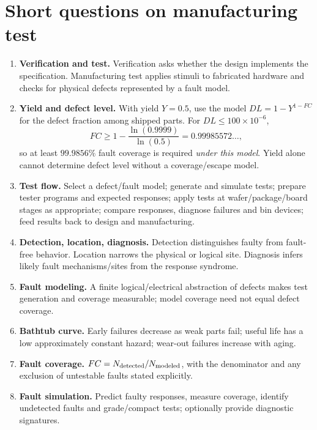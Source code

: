 \documentclass[11pt]{article}
\begin{document}
\section{Short questions on manufacturing test}
\begin{enumerate}[label=(\alph*)]
\item \textbf{Verification and test.} Verification asks whether the design implements
the specification. Manufacturing test applies stimuli to fabricated hardware and
checks for physical defects represented by a fault model.
\item \textbf{Yield and defect level.} With yield $Y=0.5$, use the model
$DL=1-Y^{1-FC}$ for the defect fraction among shipped parts.
For $DL\le100\times10^{-6}$,
\[
 FC\ge1-\frac{\ln(0.9999)}{\ln(0.5)}
 =0.99985572\ldots,
\]
so at least $99.9856\%$ fault coverage is required \emph{under this model}.
Yield alone cannot determine defect level without a coverage/escape model.
\item \textbf{Test flow.} Select a defect/fault model; generate and simulate tests;
prepare tester programs and expected responses; apply tests at wafer/package/board
stages as appropriate; compare responses, diagnose failures and bin devices;
feed results back to design and manufacturing.
\item \textbf{Detection, location, diagnosis.} Detection distinguishes faulty from
fault-free behavior. Location narrows the physical or logical site. Diagnosis
infers likely fault mechanisms/sites from the response syndrome.
\item \textbf{Fault modeling.} A finite logical/electrical abstraction of defects makes
test generation and coverage measurable; model coverage need not equal defect coverage.
\item \textbf{Bathtub curve.} Early failures decrease as weak parts fail;
useful life has a low approximately constant hazard;
wear-out failures increase with aging.
\item \textbf{Fault coverage.} $FC=N_{\rm detected}/N_{\rm modeled}$, with the
denominator and any exclusion of untestable faults stated explicitly.
\item \textbf{Fault simulation.} Predict faulty responses, measure coverage, identify
undetected faults and grade/compact tests; optionally provide diagnostic signatures.
\end{enumerate}
\begin{center}\end{center}
\end{document}
